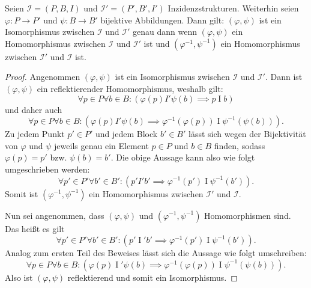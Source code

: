 \documentclass{article}
\begin{document}
\begin{theorem}
  Seien $\mathcal{I} = (P, B, I)$ und $\mathcal{I}' = (P', B', I')$ Inzidenzstrukturen.
  Weiterhin seien ${\varphi \colon P \to P'}$ und ${\psi \colon B \to B'}$ bijektive Abbildungen.
  Dann gilt: $(\varphi, \psi)$ ist ein Isomorphismus zwischen $\mathcal{I}$ und $\mathcal{I}'$ genau dann wenn
  $(\varphi, \psi)$ ein Homomorphismus zwischen $\mathcal{I}$ und $\mathcal{I}'$ ist und
  $(\varphi^{-1}, \psi^{-1})$ ein Homomorphismus zwischen $\mathcal{I}'$ und $\mathcal{I}$ ist.
\end{theorem}
\begin{proof}
  Angenommen $(\varphi, \psi)$ ist ein Isomorphismus zwischen  $\mathcal{I}$ und $\mathcal{I}'$.
  Dann ist $(\varphi, \psi)$ ein reflektierender Homomorphismus, weshalb gilt:
  \begin{equation*}
    \forall p \in P \forall b \in B \colon (\varphi(p) \mathrel{I'} \psi(b) \implies p \mathrel{I} b)
  \end{equation*}
  und daher auch
  \begin{equation*}
    \forall p \in P \forall b \in B \colon (\varphi(p) \mathrel{I'} \psi(b) \implies \varphi^{-1}(\varphi(p)) \mathrel{I} \psi^{-1}(\psi(b))).
  \end{equation*}
  Zu jedem Punkt $p' \in P'$ und jedem Block $b' \in B'$ lässt sich 
  wegen der Bijektivität von $\varphi$ und $\psi$ jeweils genau ein Element $p \in P$
  und $b \in B$ finden, sodass $\varphi(p) = p'$ bzw. $\psi(b) = b'$.
  Die obige Aussage kann also wie folgt umgeschrieben werden:
   \begin{equation*}
    \forall p' \in P' \forall b' \in B' \colon (p' \mathrel{I'} b' \implies \varphi^{-1}(p') \mathrel{I} \psi^{-1}(b')).
  \end{equation*}
  Somit ist $(\varphi^{-1}, \psi^{-1})$ ein Homomorphismus zwischen $\mathcal{I}'$ und $\mathcal{I}$.
  
  Nun sei angenommen, dass $(\varphi, \psi)$ und $(\varphi^{-1}, \psi^{-1})$ Homomorphismen sind.
  Das heißt es gilt
  \begin{equation*}
    \forall p' \in P' \forall b' \in B' \colon (p' \mathrel{I}' b' \implies \varphi^{-1}(p') \mathrel{I} \psi^{-1}(b')).
  \end{equation*}
  Analog zum ersten Teil des Beweises lässt sich die Aussage wie folgt umschreiben:
  \begin{equation*}
    \forall p \in P \forall b \in B \colon (\varphi(p) \mathrel{I}' \psi(b) \implies \varphi^{-1}(\varphi(p)) \mathrel{I} \psi^{-1}(\psi(b))).
  \end{equation*}
  Also ist $(\varphi, \psi)$ reflektierend und somit ein Isomorphismus.
\end{proof}
\end{document}
